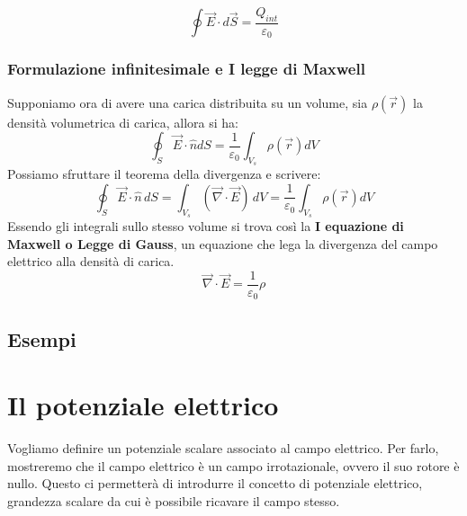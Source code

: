 \documentclass{book}
\begin{document}
\[
\boxed{
\oint \vec{E} \cdot d\vec{S}
= \frac{Q_{int}}{\varepsilon_0} 
}
\]



\subsection{Formulazione infinitesimale e I legge di Maxwell}
Supponiamo ora di avere una carica distribuita su un volume, sia $\rho(\vec{r})$ la densità volumetrica di carica, allora si ha:
$$
\oint_{S}\vec{E}\cdot \hat{n}d{S} = \frac{1}{\varepsilon_0}\int_{V_s} \rho(\vec{r})d{V}
$$
Possiamo sfruttare il teorema della divergenza e scrivere:
$$
\oint_{S} \vec{E} \cdot \hat{n}\, dS = \int_{V_s} (\vec{\nabla} \cdot \vec{E})\, dV = \frac{1}{\varepsilon_0}\int_{V_s} \rho(\vec{r})d{V}
$$
Essendo gli integrali sullo stesso volume si trova così la \textbf{I equazione di Maxwell o Legge di Gauss}, un equazione che lega la divergenza del campo elettrico alla densità di carica.
$$
\boxed{
\vec{\nabla} \cdot \vec{E} = \frac{1}{\varepsilon_0} \rho
}
$$

\section{Esempi}

\chapter{Il potenziale elettrico}
Vogliamo definire un potenziale scalare associato al campo elettrico.  
Per farlo, mostreremo che il campo elettrico è un campo irrotazionale, ovvero il suo rotore è nullo.  
Questo ci permetterà di introdurre il concetto di potenziale elettrico, grandezza scalare da cui è possibile ricavare il campo stesso.
\end{document}
